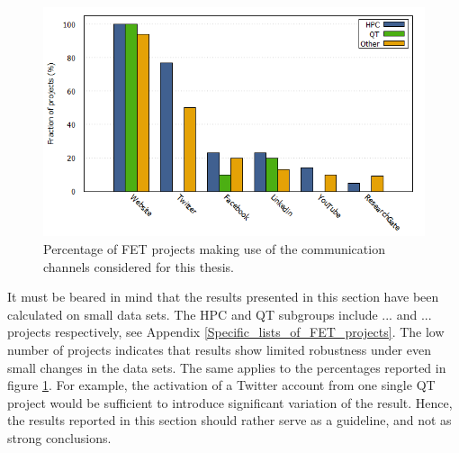 \begin{figure}[!t] 
 \begin{center}
 \includegraphics[scale=0.4]{Images/Social_media_breakdown.png}
 \caption{Percentage of FET projects making use of the communication channels considered for this thesis.}
 \label{Social_media_breakdown}
 \end{center}
\end{figure}

It must be beared in mind that the results presented in this section have been calculated on small data sets. The HPC and QT subgroups include ... and ... projects respectively, see Appendix \ref{Specific_lists_of_FET_projects}. The low number of projects indicates that results show limited robustness under even small changes in the data sets. The same applies to the percentages reported in figure \ref{Social_media_breakdown}. For example, the activation of a Twitter account from one single QT project would be sufficient to introduce significant variation of the result. Hence, the results reported in this section should rather serve as a guideline, and not as strong conclusions. 